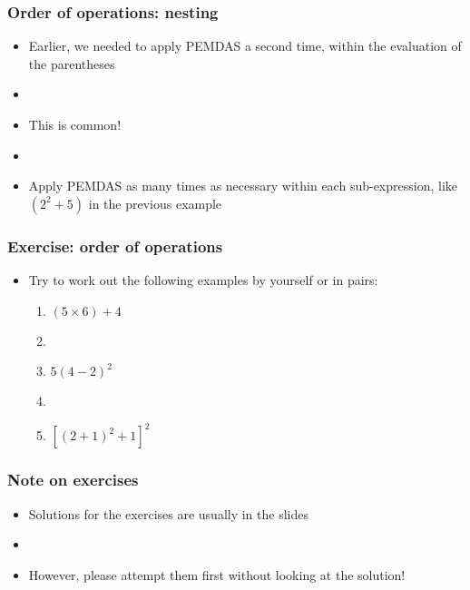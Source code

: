 \documentclass[12pt]{beamer}
\newcommand{\myframe}[1]{\begin{frame} \frametitle{#1}}
\begin{document}
\myframe{Order of operations: nesting}
\begin{itemize}
\item Earlier, we needed to apply PEMDAS a second time, within the evaluation of the parentheses
\item[]
\item This is common!
\item[]
\item Apply PEMDAS as many times as necessary within each sub-expression, like $(2^2 + 5)$ in the previous example
\end{itemize}
\end{frame}

\myframe{Exercise: order of operations}
\begin{itemize}
\item Try to work out the following examples by yourself or in pairs:
\begin{enumerate}
\item $(5 \times 6) + 4$
\item[]
\item $5(4 - 2)^2$
\item[]
\item $[(2+1)^2 + 1]^2$
\end{enumerate}
\end{itemize}
\end{frame}

\myframe{Note on exercises}
\begin{itemize}
\item Solutions for the exercises are usually in the slides
\item[]
\item However, please attempt them first without looking at the solution!
\end{itemize}
\end{frame}
\end{document}
